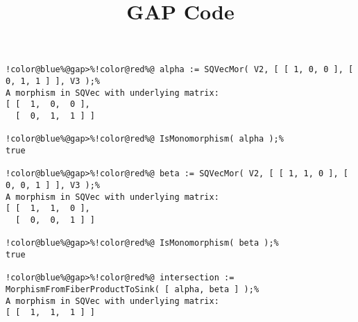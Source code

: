 \documentclass[12pt]{amsart}
\title{GAP Code}
\author{}
\begin{document}
\maketitle

\begin{Verbatim}[commandchars=!@\%,frame=single]
!color@blue%@gap>%!color@red%@ alpha := SQVecMor( V2, [ [ 1, 0, 0 ], [ 0, 1, 1 ] ], V3 );%
A morphism in SQVec with underlying matrix:
[ [  1,  0,  0 ],
  [  0,  1,  1 ] ]

!color@blue%@gap>%!color@red%@ IsMonomorphism( alpha );%
true

!color@blue%@gap>%!color@red%@ beta := SQVecMor( V2, [ [ 1, 1, 0 ], [ 0, 0, 1 ] ], V3 );%
A morphism in SQVec with underlying matrix:
[ [  1,  1,  0 ],
  [  0,  0,  1 ] ]

!color@blue%@gap>%!color@red%@ IsMonomorphism( beta );%
true

!color@blue%@gap>%!color@red%@ intersection := MorphismFromFiberProductToSink( [ alpha, beta ] );%
A morphism in SQVec with underlying matrix:
[ [  1,  1,  1 ] ]

\end{Verbatim}
\end{document}
